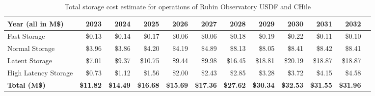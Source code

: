 \tiny \begin{longtable} { |p{}  |r  |r  |r  |r  |r  |r  |r  |r  |r  |r  |r |} 
\caption{Total storage cost estimate for operations of Rubin Observatory USDF and CHile \label{tab:opsStorageCost}}\\ 
\hline 
\textbf{Year (all in M\$)}&\textbf{2023}&\textbf{2024}&\textbf{2025}&\textbf{2026}&\textbf{2027}&\textbf{2028}&\textbf{2029}&\textbf{2030}&\textbf{2031}&\textbf{2032} \\ \hline
{Fast Storage}&{\$0.13}&{\$0.14}&{\$0.17}&{\$0.06}&{\$0.06}&{\$0.18}&{\$0.19}&{\$0.22}&{\$0.11}&{\$0.10} \\ \hline
{Normal Storage}&{\$3.96}&{\$3.86}&{\$4.20}&{\$4.19}&{\$4.89}&{\$8.13}&{\$8.05}&{\$8.41}&{\$8.42}&{\$8.41} \\ \hline
{Latent Storage}&{\$7.01}&{\$9.37}&{\$10.75}&{\$9.44}&{\$9.98}&{\$16.45}&{\$18.81}&{\$20.19}&{\$18.87}&{\$18.87} \\ \hline
{High Latency Storage}&{\$0.73}&{\$1.12}&{\$1.56}&{\$2.00}&{\$2.43}&{\$2.85}&{\$3.28}&{\$3.72}&{\$4.15}&{\$4.58} \\ \hline
\textbf{Total (M\$)}&\textbf{\$11.82}&\textbf{\$14.49}&\textbf{\$16.68}&\textbf{\$15.69}&\textbf{\$17.36}&\textbf{\$27.62}&\textbf{\$30.34}&\textbf{\$32.53}&\textbf{\$31.55}&\textbf{\$31.96} \\ \hline
\end{longtable} \normalsize
